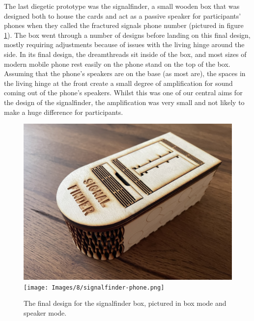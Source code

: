 The last diegetic prototype was the signalfinder, a small wooden box that was designed both to house the cards and act as a passive speaker for participants’ phones when they called the fractured signals phone number (pictured in figure \ref{fig:signalfinder}). The box went through a number of designs before landing on this final design, mostly requiring adjustments because of issues with the living hinge around the side. In its final design, the dreamthreads sit inside of the box, and most sizes of modern mobile phone rest easily on the phone stand on the top of the box. Assuming that the phone’s speakers are on the base (as most are), the spaces in the living hinge at the front create a small degree of amplification for sound coming out of the phone’s speakers. Whilst this was one of our central aims for the design of the signalfinder, the amplification was very small and not likely to make a huge difference for participants. 

\begin{figure}[!hbt]
    \centering
    \includegraphics[width=1\linewidth]{Images/8/signalfinder-top.jpeg}
    \texttt{[image: Images/8/signalfinder-phone.png]}
    \caption{The final design for the signalfinder box, pictured in box mode and speaker mode.}
    \label{fig:signalfinder}
\end{figure}

